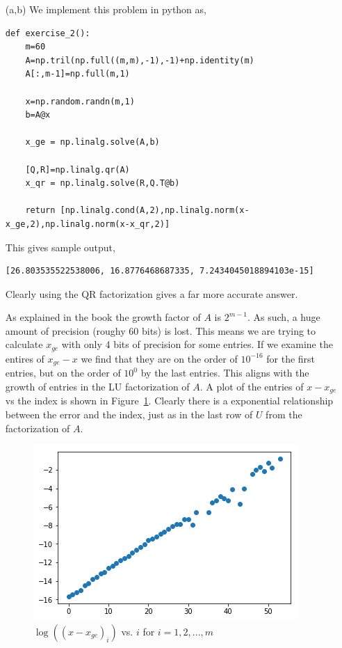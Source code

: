 \documentclass[10pt]{article}
\begin{document}
\begin{solution}[Solution]
\begin{enumerate}
    \item[(a,b)] 
    We implement this problem in python as,
    \begin{lstlisting}
def exercise_2():
    m=60
    A=np.tril(np.full((m,m),-1),-1)+np.identity(m)
    A[:,m-1]=np.full(m,1)
    
    x=np.random.randn(m,1)
    b=A@x
    
    x_ge = np.linalg.solve(A,b)
    
    [Q,R]=np.linalg.qr(A)
    x_qr = np.linalg.solve(R,Q.T@b)
    
    return [np.linalg.cond(A,2),np.linalg.norm(x-x_ge,2),np.linalg.norm(x-x_qr,2)]
    \end{lstlisting}
    
    This gives sample output,
    \begin{lstlisting}
[26.803535522538006, 16.8776468687335, 7.2434045018894103e-15]
    \end{lstlisting}

    Clearly using the QR factorization gives a far more accurate answer.

        As explained in the book the growth factor of \( A \) is \( 2^{m-1} \). As such, a huge amount of precision (roughy 60 bits) is lost. This means we are trying to calculate \( x_{ge} \) with only 4 bits of precision for some entries. If we examine the entires of \( x_{ge}-x \) we find that they are on the order of \( 10^{-16} \) for the first entries, but on the order of \( 10^{0} \) by the last entries. This aligns with the growth of entries in the LU factorization of \( A \). A plot of the entries of \( x-x_{ge} \) vs the index is shown in Figure~\ref{x-xge}. Clearly there is a exponential relationship between the error and the index, just as in the last row of \( U \) from the factorization of \( A \).

        \begin{figure}[H]\centering
            \includegraphics[scale=.5]{img/x-xge.png}
            \caption{ \( \log((x-x_{ge})_i) \) vs. \( i \) for \( i=1,2,...,m \)}
            \label{x-xge}
        \end{figure}


\end{enumerate}
\end{solution}
\end{document}
